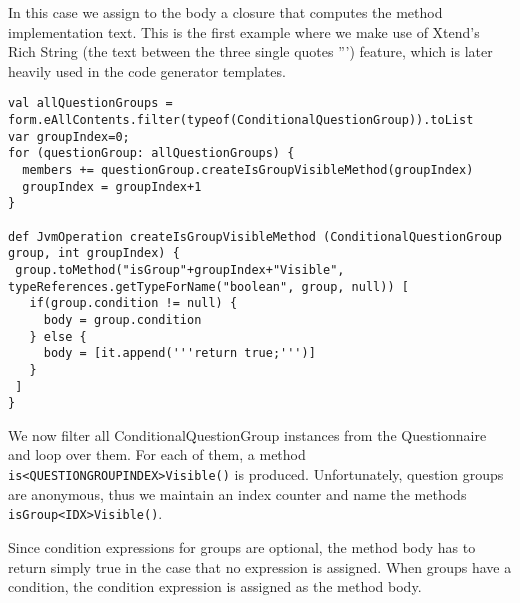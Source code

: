 In this case we assign to the body a closure that computes the method
implementation text. This is the first example where we make use of Xtend's Rich
String (the text between the three single quotes ''') feature, which is later
heavily used in the code generator templates.

\begin{lstlisting}[language=Xtend]
val allQuestionGroups = form.eAllContents.filter(typeof(ConditionalQuestionGroup)).toList
var groupIndex=0;
for (questionGroup: allQuestionGroups) {
  members += questionGroup.createIsGroupVisibleMethod(groupIndex)
  groupIndex = groupIndex+1
}

def JvmOperation createIsGroupVisibleMethod (ConditionalQuestionGroup group, int groupIndex) {
 group.toMethod("isGroup"+groupIndex+"Visible", typeReferences.getTypeForName("boolean", group, null)) [
   if(group.condition != null) {
     body = group.condition
   } else {
     body = [it.append('''return true;''')]
   }
 ]
}
\end{lstlisting}

We now filter all ConditionalQuestionGroup instances from the Questionnaire and
loop over them. For each of them, a method \texttt{is<QUESTIONGROUPINDEX>Visible()} 
is produced. Unfortunately, question groups are anonymous, thus we
maintain an index counter and name the methods \texttt{isGroup<IDX>Visible()}.

Since condition expressions for groups are optional, the method body has to
return simply true in the case that no expression is assigned. When groups have
a condition, the condition expression is assigned as the method body.

